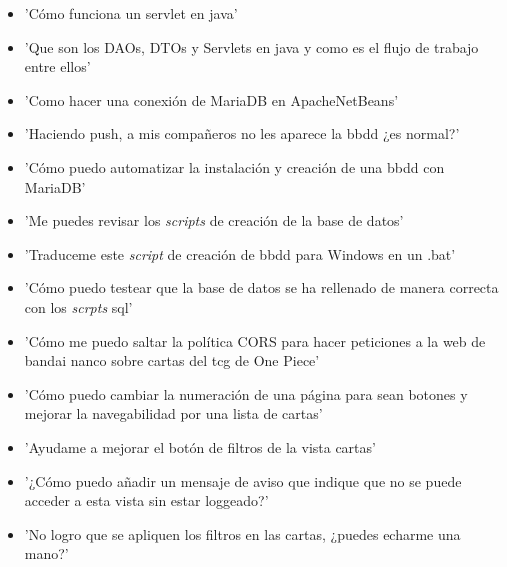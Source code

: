 \documentclass[10pt]{article}
\begin{document}
		\begin{itemize}
			\item 'Cómo funciona un servlet en java'
			\item 'Que son los DAOs, DTOs y Servlets en java y como es el flujo de trabajo entre ellos'
			\item 'Como hacer una conexión de MariaDB en ApacheNetBeans'
			\item 'Haciendo push, a mis compañeros no les aparece la bbdd ¿es normal?'
			\item 'Cómo puedo automatizar la instalación y creación de una bbdd con MariaDB'
			\item 'Me puedes revisar los \textit{scripts} de creación de la base de datos'
			\item 'Traduceme este \textit{script} de creación de bbdd para Windows en un .bat'
			\item 'Cómo puedo testear que la base de datos se ha rellenado de manera correcta con los \textit{scrpts} sql'
			\item 'Cómo me puedo saltar la política CORS para hacer peticiones a la web de bandai nanco sobre cartas del tcg de One Piece'
			\item 'Cómo puedo cambiar la numeración de una página para sean botones y mejorar la navegabilidad por una lista de cartas'
	        \item 'Ayudame a mejorar el botón de filtros de la vista cartas'
	        \item '¿Cómo puedo añadir un mensaje de aviso que indique que no se puede acceder a esta vista sin estar loggeado?'
	        \item 'No logro que se apliquen los filtros en las cartas, ¿puedes echarme una mano?'
		\end{itemize}
	
	
\end{document}
